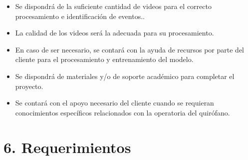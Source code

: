 \documentclass[
11pt, %
]{charter}
\begin{document}
\begin{itemize}
	\item Se dispondrá de la suficiente cantidad de videos para el correcto procesamiento e identificación de eventos..
	\item La calidad de los videos será la adecuada para su procesamiento.
	\item En caso de ser necesario, se contará con la ayuda de recursos por parte del cliente para el procesamiento y entrenamiento del modelo.
	\item Se dispondrá de materiales y/o de soporte académico para completar el proyecto.
	\item Se contará con el apoyo necesario del cliente cuando se requieran conocimientos específicos relacionados con la operatoria del quirófano.
\end{itemize}


\section{6. Requerimientos}
\label{sec:requerimientos}
\end{document}
